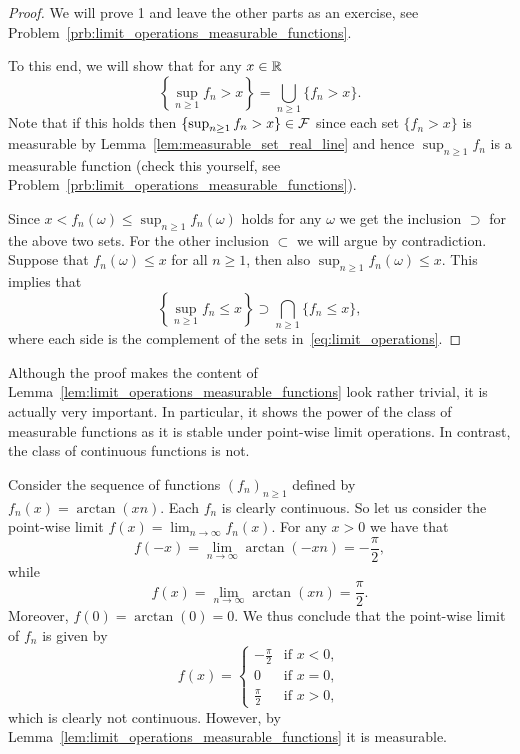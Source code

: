 \begin{proof}
We will prove 1 and leave the other parts as an exercise, see Problem~\ref{prb:limit_operations_measurable_functions}. 

To this end, we will show that for any $x \in \mathbb R$
\begin{equation}\label{eq:limit_operations}
	\left\{\sup_{n \ge 1} f_n > x\right\} = \bigcup_{n \ge 1} \{f_n > x\}.
\end{equation}
Note that if this holds then $\{\sup_{n \ge 1} f_n > x\} \in \mathcal F$ since each set $\{f_n > x\}$ is measurable by Lemma~\ref{lem:measurable_set_real_line} and hence $\sup_{n \ge 1} f_n$ is a measurable function (check this yourself, see Problem~\ref{prb:limit_operations_measurable_functions}).

Since $x < f_n(\omega) \le \sup_{n \ge 1} f_n(\omega)$ holds for any $\omega$ we get the inclusion $\supset$ for the above two sets. For the other inclusion $\subset$ we will argue by contradiction. Suppose that $f_n(\omega) \le x$ for all $n \ge 1$, then also $\sup_{n \ge 1} f_n(\omega) \le x$. This implies that
\[
	\left\{\sup_{n \ge 1} f_n \le x\right\} \supset \bigcap_{n \ge 1} \{f_n \le x\},
\] 
where each side is the complement of the sets in~\eqref{eq:limit_operations}.
\end{proof}

Although the proof makes the content of Lemma~\ref{lem:limit_operations_measurable_functions} look rather trivial, it is actually very important. In particular, it shows the power of the class of measurable functions as it is stable under point-wise limit operations. In contrast, the class of continuous functions is not. 

\begin{example}
Consider the sequence of functions $(f_n)_{n \ge 1}$ defined by $f_n(x) = \arctan(xn)$. Each $f_n$ is clearly continuous. So let us consider the point-wise limit $f(x) = \lim_{n \to \infty} f_n(x)$. For any $x > 0$ we have that
\[
	f(-x) = \lim_{n \to \infty} \arctan(-x n) = -\frac{\pi}{2},
\]
while
\[
	f(x) = \lim_{n \to \infty} \arctan(x n) = \frac{\pi}{2}.
\]
Moreover, $f(0) = \arctan(0) = 0$. We thus conclude that the point-wise limit of $f_n$ is given by
\[
	f(x) = \begin{cases}
		-\frac{\pi}{2} &\text{if } x < 0,\\
		0 &\text{if } x = 0,\\
		\frac{\pi}{2} &\text{if } x >0,
	\end{cases}
\]
which is clearly not continuous. However, by Lemma~\ref{lem:limit_operations_measurable_functions} it is measurable.
\end{example}

